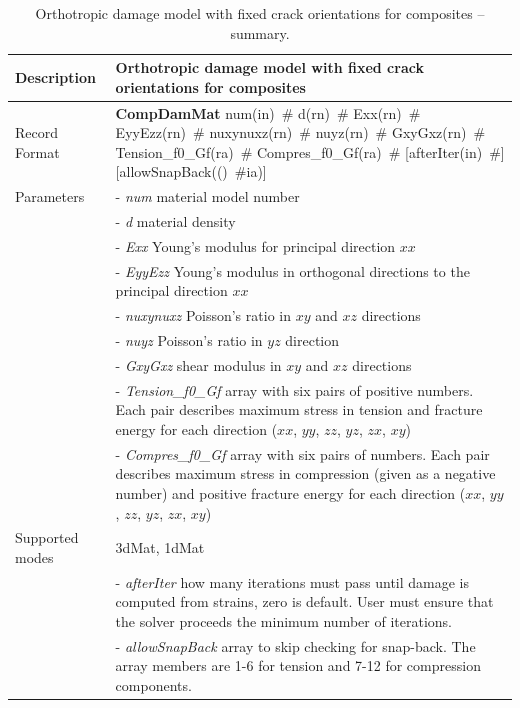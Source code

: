 \documentclass[a4paper]{article}
\newcommand{\descitem}[1]{{\noindent \bf #1}}
\newcommand{\elemparam}[2]{{{#1\tiny (#2)}~\#}}
\newcommand{\param}[1]{{\it #1}}
\begin{document}
\begin{table}[!htb]
\begin{tabular}{|l|p{9cm}|}
\hline
Description & Orthotropic damage model with fixed crack orientations for composites\\
\hline
Record Format & \descitem{CompDamMat}  \elemparam{num}{in}
\elemparam{d}{rn} \elemparam{Exx}{rn} \elemparam{EyyEzz}{rn}
\elemparam{nuxynuxz}{rn} \elemparam{nuyz}{rn} \elemparam{GxyGxz}{rn}
\elemparam{Tension\_f0\_Gf}{ra} \elemparam{Compres\_f0\_Gf}{ra} [\elemparam{afterIter}{in}] [\elemparam{allowSnapBack}(ia)]\\
Parameters
&- \param{num} material model number\\
&- \param{d} material density\\
&- \param{Exx} Young's modulus for principal direction $xx$\\
&- \param{EyyEzz} Young's modulus in orthogonal directions to the principal direction $xx$\\
&- \param{nuxynuxz} Poisson's ratio in $xy$ and $xz$ directions\\
&- \param{nuyz} Poisson's ratio in $yz$ direction\\
&- \param{GxyGxz} shear modulus in $xy$ and $xz$ directions\\
&- \param{Tension\_f0\_Gf} array with six pairs of positive numbers. Each pair describes maximum stress in tension and fracture energy for each direction ($xx$, $yy$, $zz$, $yz$, $zx$, $xy$)\\
&- \param{Compres\_f0\_Gf} array with six pairs of numbers. Each pair describes maximum stress in compression (given as a negative number) and positive fracture energy for each direction ($xx$, $yy$, $zz$, $yz$, $zx$, $xy$)\\
Supported modes& 3dMat, 1dMat\\
&- \param {afterIter} how many iterations must pass until damage is computed from strains, zero is default. User must ensure that the solver proceeds the minimum number of iterations.\\
&- \param {allowSnapBack} array to skip checking for snap-back. The array members are 1-6 for tension and 7-12 for compression components.\\
\hline
\end{tabular}
\caption{Orthotropic damage model with fixed crack orientations for composites -- summary.}
\label{compdammat_table}
\end{table}
\end{document}
